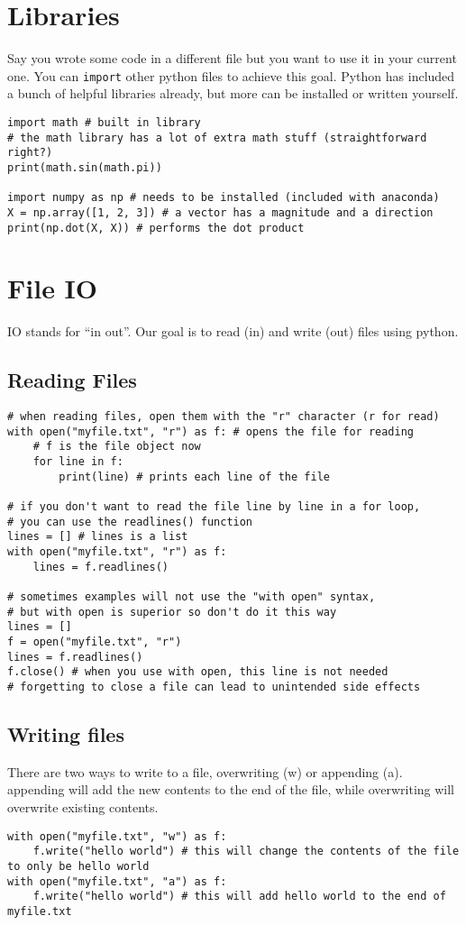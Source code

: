 \documentclass{assignments}
\begin{document}
\section*{Libraries}
\label{sec:orge7ab5e3}
Say you wrote some code in a different file but you want to use it in your
current one. You can \texttt{import} other python files to achieve this goal. Python has
included a bunch of helpful libraries already, but more can be installed or
written yourself.
\begin{verbatim}
import math # built in library
# the math library has a lot of extra math stuff (straightforward right?)
print(math.sin(math.pi))

import numpy as np # needs to be installed (included with anaconda)
X = np.array([1, 2, 3]) # a vector has a magnitude and a direction
print(np.dot(X, X)) # performs the dot product

\end{verbatim}
\section*{File IO}
\label{sec:orgbdab583}
IO stands for ``in out''. Our goal is to read (in) and write (out) files using python.
\subsection*{Reading Files}
\label{sec:org5eb3756}
\begin{verbatim}
# when reading files, open them with the "r" character (r for read)
with open("myfile.txt", "r") as f: # opens the file for reading
    # f is the file object now
    for line in f:
        print(line) # prints each line of the file

# if you don't want to read the file line by line in a for loop,
# you can use the readlines() function
lines = [] # lines is a list
with open("myfile.txt", "r") as f:
    lines = f.readlines()

# sometimes examples will not use the "with open" syntax,
# but with open is superior so don't do it this way
lines = []
f = open("myfile.txt", "r")
lines = f.readlines()
f.close() # when you use with open, this line is not needed
# forgetting to close a file can lead to unintended side effects
\end{verbatim}
\subsection*{Writing files}
\label{sec:org2262b5b}
There are two ways to write to a file, overwriting (w) or appending (a).
appending will add the new contents to the end of the file, while overwriting
will overwrite existing contents.
\begin{verbatim}
with open("myfile.txt", "w") as f:
    f.write("hello world") # this will change the contents of the file to only be hello world
with open("myfile.txt", "a") as f:
    f.write("hello world") # this will add hello world to the end of myfile.txt

\end{verbatim}
\end{document}
